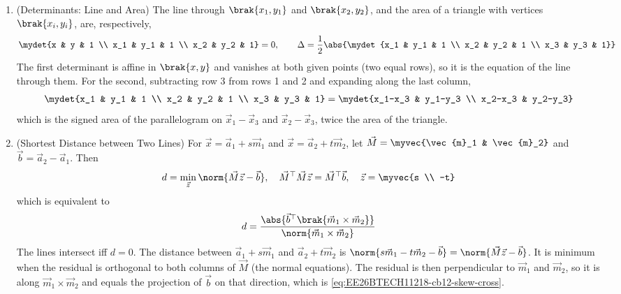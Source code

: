 \begin{enumerate}[label=\thesubsection.\arabic*, ref=\thesubsection.\theenumi,itemsep=1.5em]
\item (Determinants: Line and Area) The line through $\brak{x_1,y_1}$ and $\brak{x_2,y_2}$, and the area of a triangle with vertices $\brak{x_i,y_i}$, are, respectively,
\begin{align}
\mydet{x & y & 1 \\ x_1 & y_1 & 1 \\ x_2 & y_2 & 1} = 0, \qquad
\Delta = \frac{1}{2}\abs{\mydet{x_1 & y_1 & 1 \\ x_2 & y_2 & 1 \\ x_3 & y_3 & 1}}
\label{eq:EE26BTECH11218-cb12-det}
\end{align}
\solution The first determinant is affine in $\brak{x,y}$ and vanishes at both given points (two equal rows), so it is the equation of the line through them. For the second, subtracting row 3 from rows 1 and 2 and expanding along the last column,
\begin{align}
\mydet{x_1 & y_1 & 1 \\ x_2 & y_2 & 1 \\ x_3 & y_3 & 1} = \mydet{x_1-x_3 & y_1-y_3 \\ x_2-x_3 & y_2-y_3}
\end{align}
which is the signed area of the parallelogram on $\vec{x}_1-\vec{x}_3$ and $\vec{x}_2-\vec{x}_3$, twice the area of the triangle.

\item (Shortest Distance between Two Lines) For $\vec{x}=\vec{a}_1+s\vec{m}_1$ and $\vec{x}=\vec{a}_2+t\vec{m}_2$, let $\vec{M}=\myvec{\vec{m}_1 & \vec{m}_2}$ and $\vec{b}=\vec{a}_2-\vec{a}_1$. Then
\begin{align}
d = \min_{\vec{z}}\norm{\vec{M}\vec{z}-\vec{b}}, \quad \vec{M}^{\top}\vec{M}\vec{z} = \vec{M}^{\top}\vec{b}, \quad \vec{z}=\myvec{s \\ -t}
\label{eq:EE26BTECH11218-cb12-skew}
\end{align}
which is equivalent to
\begin{align}
d = \frac{\abs{\vec{b}^{\top}\brak{\vec{m}_1\times\vec{m}_2}}}{\norm{\vec{m}_1\times\vec{m}_2}}
\label{eq:EE26BTECH11218-cb12-skew-cross}
\end{align}
The lines intersect iff $d=0$.
\solution The distance between $\vec{a}_1+s\vec{m}_1$ and $\vec{a}_2+t\vec{m}_2$ is $\norm{s\vec{m}_1-t\vec{m}_2-\vec{b}}=\norm{\vec{M}\vec{z}-\vec{b}}$. It is minimum when the residual is orthogonal to both columns of $\vec{M}$ (the normal equations). The residual is then perpendicular to $\vec{m}_1$ and $\vec{m}_2$, so it is along $\vec{m}_1\times\vec{m}_2$ and equals the projection of $\vec{b}$ on that direction, which is \eqref{eq:EE26BTECH11218-cb12-skew-cross}.


\end{enumerate}
